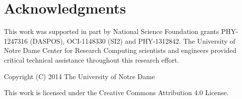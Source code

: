 \documentclass{sig-alternate}
\begin{document}
\section*{Acknowledgments}

This work was supported in part by National Science Foundation grants PHY-1247316 (DASPOS), 
OCI-1148330 (SI2) and PHY-1312842.
The University of Notre Dame Center for Research Computing scientists and engineers provided critical technical assistance throughout this research effort.

Copyright (C) 2014 The University of Notre Dame

This work is licensed under the Creative Commons Attribution 4.0 License.



\end{document}
